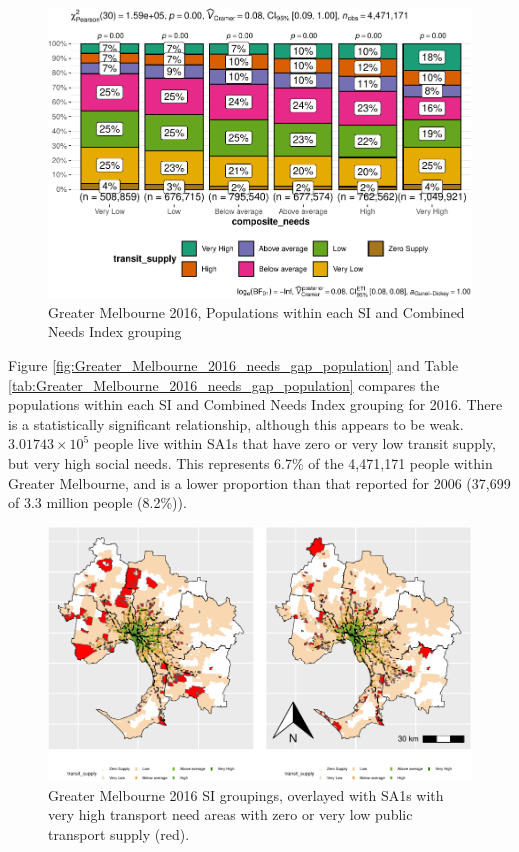 \documentclass[preprint, 3p,
authoryear]{elsarticle} %
\begin{document}
\begin{figure}
\centering
\includegraphics{Leveraging_GTFS_to_assess_transit_supply_Transport_Geography_files/figure-latex/Greater_Melbourne_2016_needs_gap_population-1.pdf}
\caption{Greater Melbourne 2016, Populations within each SI and Combined
Needs Index grouping}
\end{figure}

Figure \ref{fig:Greater_Melbourne_2016_needs_gap_population} and Table
\ref{tab:Greater_Melbourne_2016_needs_gap_population} compares the
populations within each SI and Combined Needs Index grouping for 2016.
There is a statistically significant relationship, although this appears
to be weak. \ensuremath{3.01743\times 10^{5}} people live within SA1s
that have zero or very low transit supply, but very high social needs.
This represents 6.7\% of the 4,471,171 people within Greater Melbourne,
and is a lower proportion than that reported for 2006 (37,699 of 3.3
million people (8.2\%)).

\begin{figure}
\includegraphics[width=1\linewidth]{Leveraging_GTFS_to_assess_transit_supply_Transport_Geography_files/figure-latex/Greater_Melbourne_2016_needs_gap_map-1} \caption{Greater Melbourne 2016 SI groupings, overlayed with SA1s with very high transport need areas with zero or very low public transport supply (red).}\label{fig:Greater_Melbourne_2016_needs_gap_map}
\end{figure}
\end{document}

